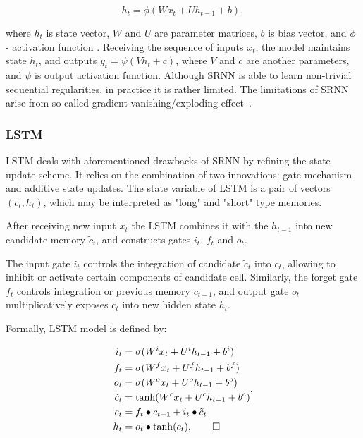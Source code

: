 \documentclass[a4paper,11pt]{article}
\begin{document}
\begin{equation}
\label{eq:SRNN}
h_{t} = \phi(Wx_{t} + Uh_{t-1} + b),
\end{equation}

\noindent where $h_{t}$ is state vector, $W$ and $U$ are parameter matrices, $b$ is bias vector, and $\phi$ - activation function \cite{Elman}. 
Receiving the sequence of inputs $x_{t}$, the model maintains  state $h_{t}$, and 
outputs $y_{t} = \psi(Vh_{t} + c)$, where $V$ and $c$ are another parameters, and $\psi$ is output activation function. Although SRNN is able to learn non-trivial sequential regularities, in practice it is rather limited. The limitations of SRNN arise from so called gradient vanishing/exploding effect~\cite{Bengio}.



\subsubsection{LSTM}


LSTM \cite{Hochreiter} deals with aforementioned drawbacks of SRNN by refining the state update scheme. It relies on the combination of two innovations: gate mechanism and additive state updates. The state  variable of LSTM is a pair of vectors $(c_{t}, h_{t})$, which may be interpreted as "long" and "short" type memories. 


After receiving new input $x_{t}$ the LSTM combines it with the $h_{t-1}$ into new candidate memory $
\tilde{c}_{t}$, and constructs gates $i_{t}$, $f_{t}$ and $o_{t}$. 

The input gate $i_{t}$ controls the integration of candidate $\tilde{c}_{t}$ into $c_{t}$, allowing to 
inhibit or activate certain components of candidate cell. Similarly, the forget gate $f_{t}$ controls integration or previous memory $c_{t-1}$, 
and output gate $o_{t}$ multiplicatively exposes $c_{t}$ into new hidden state $h_{t}$.

Formally, LSTM model is defined by:

\begin{align}
\begin{split}
\label{LSTM}
i_{t} &=\sigma(W^{i}x_{t} + U^{i}h_{t-1} + b^{i})\\
f_{t} &=\sigma(W^{f}x_{t} + U^{f}h_{t-1} + b^{f})\\
o_{t} &=\sigma(W^{o}x_{t} + U^{o}h_{t-1} + b^{o})\\
\tilde{c}_{t} &= \tanh(W^{c}x_{t} + U^{c}h_{t-1} + b^{c})\\
c_{t} &=f_{t} \bullet c_{t-1} + i_{t} \bullet \tilde{c}_{t}\\
h_{t} &=o_{t} \bullet \tanh(c_{t}), \qedhere
\end{split},
\end{align}
\end{document}
